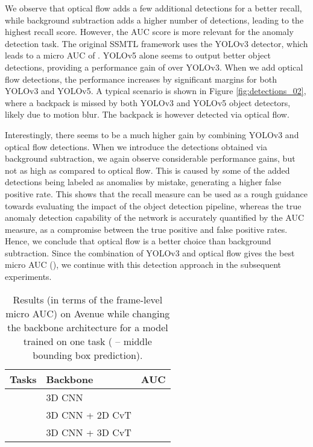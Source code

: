 \documentclass[times,twocolumn,final,authoryear]{elsarticle}
\begin{document}
We observe that optical flow adds a few additional detections for a better recall, while background subtraction adds a higher number of detections, leading to the highest recall score. However, the AUC score is more relevant for the anomaly detection task.
The original SSMTL framework uses the YOLOv3 detector, which leads to a micro AUC of . YOLOv5 alone seems to output better object detections, providing a performance gain of  over YOLOv3. When we add optical flow detections, the performance increases by significant margins for both YOLOv3 and YOLOv5. A typical scenario is shown in Figure \ref{fig:detections_02}, where a backpack is missed by both YOLOv3 and YOLOv5 object detectors, likely due to motion blur. The backpack is however detected via optical flow. 

Interestingly, there seems to be a much higher gain by combining YOLOv3 and optical flow detections. When we introduce the detections obtained via background subtraction, we again observe considerable performance gains, but not as high as compared to optical flow. This is caused by some of the added detections being labeled as anomalies by mistake, generating a higher false positive rate. This shows that the recall measure can be used as a rough guidance towards evaluating the impact of the object detection pipeline, whereas the true anomaly detection capability of the network is accurately quantified by the AUC measure, as a compromise between the true positive and false positive rates.
Hence, we conclude that optical flow is a better choice than background subtraction. Since the combination of YOLOv3 and optical flow gives the best micro AUC (), we continue with this detection approach in the subsequent experiments.

\begin{table}[t]
\caption{Results (in terms of the frame-level micro AUC) on Avenue while changing the backbone architecture for a model trained on one task ( -- middle bounding box prediction).}\label{tab_backbone_1task}
\begin{center}
\begin{tabular}{|l|l|c|}
\hline
{Tasks} & {Backbone} & {AUC} \\
\hline\hline
               & 3D CNN            &  \\
               & 3D CNN + 2D CvT   &  \\
               & 3D CNN + 3D CvT   &  \\
\hline
\end{tabular}
\end{center}
\end{table}
\end{document}
